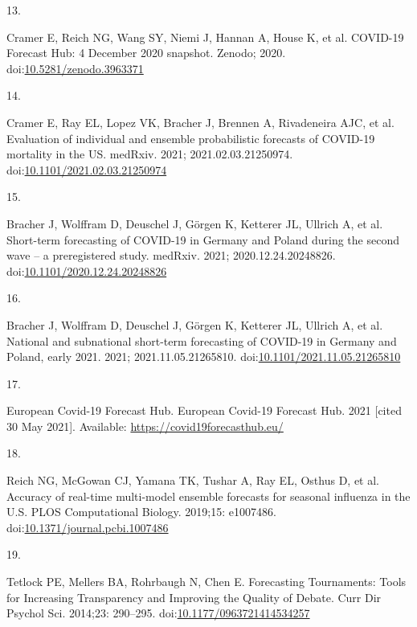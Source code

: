 \documentclass[10pt,letterpaper]{article}
\newlength{\cslhangindent}
\newlength{\csllabelwidth}
\newlength{\cslentryspacingunit} %
\newenvironment{CSLReferences}[2] %
 {%
  \setlength{\parindent}{0pt}
  \ifodd #1
  \let\oldpar\par
  \def\par{\hangindent=\cslhangindent\oldpar}
  \fi
  \setlength{\parskip}{#2\cslentryspacingunit}
 }%
 {}
\newcommand{\CSLLeftMargin}[1]{\parbox[t]{\csllabelwidth}{#1}}
\newcommand{\CSLRightInline}[1]{\parbox[t]{\linewidth - \csllabelwidth}{#1}\break}
\begin{document}
\begin{CSLReferences}{0}{0}
\leavevmode{}%
\CSLLeftMargin{13. }%
\CSLRightInline{Cramer E, Reich NG, Wang SY, Niemi J, Hannan A, House K,
et al. {COVID-19 Forecast Hub}: 4 {December} 2020 snapshot. {Zenodo};
2020.
doi:\href{https://doi.org/10.5281/zenodo.3963371}{10.5281/zenodo.3963371}}

\leavevmode{}%
\CSLLeftMargin{14. }%
\CSLRightInline{Cramer E, Ray EL, Lopez VK, Bracher J, Brennen A,
Rivadeneira AJC, et al. Evaluation of individual and ensemble
probabilistic forecasts of {COVID-19} mortality in the {US}. medRxiv.
2021; 2021.02.03.21250974.
doi:\href{https://doi.org/10.1101/2021.02.03.21250974}{10.1101/2021.02.03.21250974}}

\leavevmode{}%
\CSLLeftMargin{15. }%
\CSLRightInline{Bracher J, Wolffram D, Deuschel J, Görgen K, Ketterer
JL, Ullrich A, et al. Short-term forecasting of {COVID-19} in {Germany}
and {Poland} during the second wave -- a preregistered study. medRxiv.
2021; 2020.12.24.20248826.
doi:\href{https://doi.org/10.1101/2020.12.24.20248826}{10.1101/2020.12.24.20248826}}

\leavevmode{}%
\CSLLeftMargin{16. }%
\CSLRightInline{Bracher J, Wolffram D, Deuschel J, Görgen K, Ketterer
JL, Ullrich A, et al. National and subnational short-term forecasting of
{COVID-19} in {Germany} and {Poland}, early 2021. 2021;
2021.11.05.21265810.
doi:\href{https://doi.org/10.1101/2021.11.05.21265810}{10.1101/2021.11.05.21265810}}

\leavevmode{}%
\CSLLeftMargin{17. }%
\CSLRightInline{European Covid-19 Forecast Hub. European {Covid-19
Forecast Hub}. 2021 {[}cited 30 May 2021{]}. Available:
\url{https://covid19forecasthub.eu/}}

\leavevmode{}%
\CSLLeftMargin{18. }%
\CSLRightInline{Reich NG, McGowan CJ, Yamana TK, Tushar A, Ray EL,
Osthus D, et al. Accuracy of real-time multi-model ensemble forecasts
for seasonal influenza in the {U}.{S}. PLOS Computational Biology.
2019;15: e1007486.
doi:\href{https://doi.org/10.1371/journal.pcbi.1007486}{10.1371/journal.pcbi.1007486}}

\leavevmode{}%
\CSLLeftMargin{19. }%
\CSLRightInline{Tetlock PE, Mellers BA, Rohrbaugh N, Chen E. Forecasting
{Tournaments}: {Tools} for {Increasing Transparency} and {Improving} the
{Quality} of {Debate}. Curr Dir Psychol Sci. 2014;23: 290--295.
doi:\href{https://doi.org/10.1177/0963721414534257}{10.1177/0963721414534257}}


\end{CSLReferences}
\end{document}
